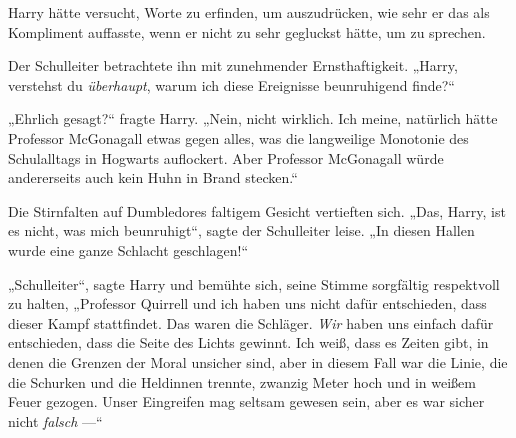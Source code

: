 Harry hätte versucht, Worte zu erfinden, um auszudrücken, wie sehr er das als Kompliment auffasste, wenn er nicht zu sehr gegluckst hätte, um zu sprechen.

Der Schulleiter betrachtete ihn mit zunehmender Ernsthaftigkeit.
„Harry, verstehst du \emph{überhaupt}, warum ich diese Ereignisse beunruhigend finde?“

„Ehrlich gesagt?“ fragte Harry.
„Nein, nicht wirklich. Ich meine, natürlich hätte Professor McGonagall etwas gegen alles, was die langweilige Monotonie des Schulalltags in Hogwarts auflockert. Aber Professor McGonagall würde andererseits auch kein Huhn in Brand stecken.“

Die Stirnfalten auf Dumbledores faltigem Gesicht vertieften sich.
„Das, Harry, ist es nicht, was mich beunruhigt“, sagte der Schulleiter leise.
„In diesen Hallen wurde eine ganze Schlacht geschlagen!“

„Schulleiter“, sagte Harry und bemühte sich, seine Stimme sorgfältig respektvoll zu halten,
„Professor Quirrell und ich haben uns nicht dafür entschieden, dass dieser Kampf stattfindet. Das waren die Schläger. \emph{Wir} haben uns einfach dafür entschieden, dass die Seite des Lichts gewinnt. Ich weiß, dass es Zeiten gibt, in denen die Grenzen der Moral unsicher sind, aber in diesem Fall war die Linie, die die Schurken und die Heldinnen trennte, zwanzig Meter hoch und in weißem Feuer gezogen. Unser Eingreifen mag seltsam gewesen sein, aber es war sicher nicht \emph{falsch} —“

